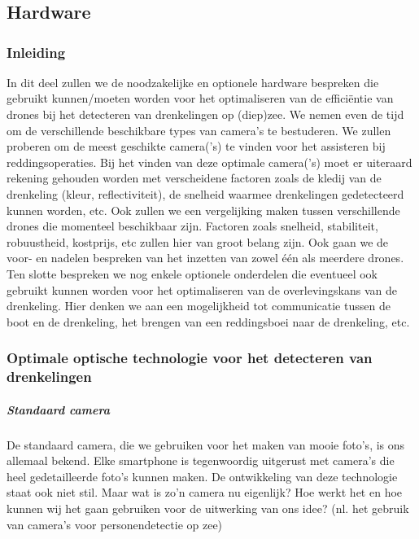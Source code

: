 \chapter{}
\label{ch:stand-van-zaken}

\section{Hardware}
\subsection{Inleiding}

In dit deel zullen we de noodzakelijke en optionele hardware bespreken die gebruikt kunnen/moeten worden voor het optimaliseren van de efficiëntie van drones bij het detecteren van drenkelingen op (diep)zee. We nemen even de tijd om de verschillende beschikbare types van camera's te bestuderen. We zullen proberen om de meest geschikte camera('s) te vinden voor het assisteren bij reddingsoperaties. Bij het vinden van deze optimale camera('s) moet er uiteraard rekening gehouden worden met verscheidene factoren zoals de kledij van de drenkeling (kleur, reflectiviteit), de snelheid waarmee drenkelingen gedetecteerd kunnen worden, etc. Ook zullen we een vergelijking maken tussen verschillende drones die momenteel beschikbaar zijn. Factoren zoals snelheid, stabiliteit, robuustheid, kostprijs, etc zullen hier van groot belang zijn. Ook gaan we de voor- en nadelen bespreken van het inzetten van zowel één als meerdere drones. Ten slotte bespreken we nog enkele optionele onderdelen die eventueel ook gebruikt kunnen worden voor het optimaliseren van de overlevingskans van de drenkeling. Hier denken we aan een mogelijkheid tot communicatie tussen de boot en de drenkeling, het brengen van een reddingsboei naar de drenkeling, etc.

\subsection{Optimale optische technologie voor het detecteren van drenkelingen}

\paragraph{Standaard camera}

De standaard camera, die we gebruiken voor het maken van mooie foto's, is ons allemaal bekend. Elke smartphone is tegenwoordig uitgerust met camera's die heel gedetailleerde foto's kunnen maken. De ontwikkeling van deze technologie staat ook niet stil. Maar wat is zo'n camera nu eigenlijk? Hoe werkt het en hoe kunnen wij het gaan gebruiken voor de uitwerking van ons idee? (nl. het gebruik van camera's voor personendetectie op zee)

